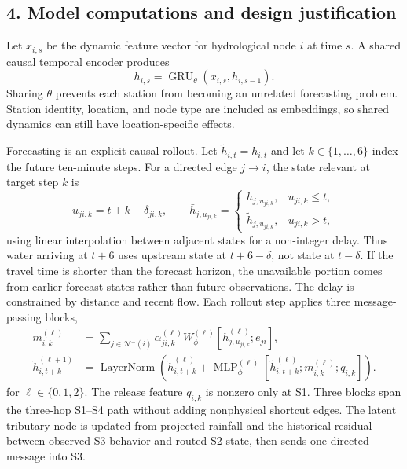 \documentclass{article}
\begin{document}
\subsection*{4. Model computations and design justification}

Let $x_{i,s}$ be the dynamic feature vector for hydrological node $i$ at time $s$. A shared causal temporal encoder produces
\begin{equation}
  h_{i,s}=\operatorname{GRU}_{\theta}\!\left(x_{i,s},h_{i,s-1}\right).
\end{equation}
Sharing $\theta$ prevents each station from becoming an unrelated forecasting problem. Station identity, location, and node type are included as embeddings, so shared dynamics can still have location-specific effects.

Forecasting is an explicit causal rollout. Let $\tilde h_{i,t}=h_{i,t}$ and let $k\in\{1,\ldots,6\}$ index the future ten-minute steps. For a directed edge $j\rightarrow i$, the state relevant at target step $k$ is
\begin{equation}
  u_{ji,k}=t+k-\delta_{ji,k},\qquad
  \bar h_{j,u_{ji,k}}=
  \begin{cases}
    h_{j,u_{ji,k}}, & u_{ji,k}\leq t,\\
    \tilde h_{j,u_{ji,k}}, & u_{ji,k}>t,
  \end{cases}
\end{equation}
using linear interpolation between adjacent states for a non-integer delay. Thus water arriving at $t+6$ uses upstream state at $t+6-\delta$, not state at $t-\delta$. If the travel time is shorter than the forecast horizon, the unavailable portion comes from earlier forecast states rather than future observations. The delay is constrained by distance and recent flow. Each rollout step applies three message-passing blocks,
\begin{align}
  m_{i,k}^{(\ell)}
  &=\sum_{j\in\mathcal{N}^{-}(i)}
  \alpha_{ji,k}^{(\ell)}W_{\phi}^{(\ell)}
  [\bar h_{j,u_{ji,k}}^{(\ell)};e_{ji}],\\
  \tilde h_{i,t+k}^{(\ell+1)}
  &=\operatorname{LayerNorm}\!\left(\tilde h_{i,t+k}^{(\ell)}+
  \operatorname{MLP}_{\phi}^{(\ell)}
  [\tilde h_{i,t+k}^{(\ell)};m_{i,k}^{(\ell)};q_{i,k}]\right).
\end{align}
for $\ell\in\{0,1,2\}$. The release feature $q_{i,k}$ is nonzero only at S1. Three blocks span the three-hop S1--S4 path without adding nonphysical shortcut edges. The latent tributary node is updated from projected rainfall and the historical residual between observed S3 behavior and routed S2 state, then sends one directed message into S3.
\end{document}
